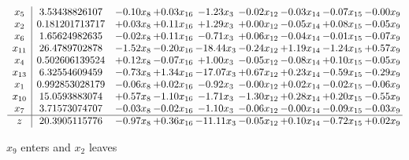 \documentclass[9pt]{article}
\begin{document}
 \[\begin{array}{c| c c@{\hskip 2pt} c@{\hskip 2pt} c@{\hskip 2pt} c@{\hskip 2pt} c@{\hskip 2pt} c@{\hskip 2pt} c@{\hskip 2pt} }
 x_{5}   &  3.53438826107 & -0.10 x_{8} & +  0.03 x_{16} & -1.23 x_{3} & -0.02 x_{12} & -0.03 x_{14} & -0.07 x_{15} & -0.00 x_{9}\\
 x_{2}   &  0.181201713717 & +  0.03 x_{8} & +  0.11 x_{16} & +  1.29 x_{3} & +  0.00 x_{12} & -0.05 x_{14} & +  0.08 x_{15} & -0.05 x_{9}\\
 x_{6}   &  1.65624982635 & -0.02 x_{8} & +  0.11 x_{16} & -0.71 x_{3} & +  0.06 x_{12} & -0.04 x_{14} & -0.01 x_{15} & -0.07 x_{9}\\
 x_{11}   &  26.4789702878 & -1.52 x_{8} & -0.20 x_{16} & -18.44 x_{3} & -0.24 x_{12} & +  1.19 x_{14} & -1.24 x_{15} & +  0.57 x_{9}\\
 x_{4}   &  0.502606139524 & +  0.12 x_{8} & -0.07 x_{16} & +  1.00 x_{3} & -0.05 x_{12} & -0.08 x_{14} & +  0.10 x_{15} & -0.05 x_{9}\\
 x_{13}   &  6.32554609459 & -0.73 x_{8} & +  1.34 x_{16} & -17.07 x_{3} & +  0.67 x_{12} & +  0.23 x_{14} & -0.59 x_{15} & -0.29 x_{9}\\
 x_{1}   &  0.992853028179 & -0.06 x_{8} & +  0.02 x_{16} & -0.92 x_{3} & -0.00 x_{12} & +  0.02 x_{14} & -0.02 x_{15} & -0.06 x_{9}\\
 x_{10}   &  15.0593883074 & +  0.57 x_{8} & -1.10 x_{16} & -1.71 x_{3} & -1.30 x_{12} & +  0.28 x_{14} & +  0.20 x_{15} & -0.55 x_{9}\\
 x_{7}   &  3.71573074707 & -0.03 x_{8} & -0.02 x_{16} & -1.10 x_{3} & -0.06 x_{12} & -0.00 x_{14} & -0.09 x_{15} & -0.03 x_{9}\\
\hline
z    &  20.3905115776 & -0.97 x_{8} & +  0.36 x_{16} & -11.11 x_{3} & -0.05 x_{12} & +  0.10 x_{14} & -0.72 x_{15} & +  0.02 x_{9}\\
\end{array}\]


 $ x_{9} $ enters and $ x_{2} $ leaves 
\end{document}

